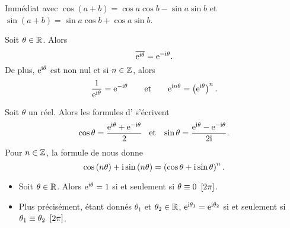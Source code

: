 \documentclass{magnolia}
\begin{document}
\begin{preuve}
Immédiat avec $\cos(a+b)=\cos a\cos b-\sin a\sin b$ et $\sin(a+b)=\sin a\cos b+\cos a\sin b$.
\end{preuve}

\begin{proposition}[utile=-3]
Soit $\theta\in\mathbb{R}$. Alors
\[\overline{{\rm e}^{{\rm i}\theta}}={\rm e}^{-{\rm i}\theta}.\]
De plus, ${\rm e}^{{\rm i}\theta}$ est non nul et si $n\in\mathbb{Z}$, alors
\[\frac{1}{{\rm e}^{{\rm i}\theta}}={\rm e}^{-{\rm i}\theta} \qquad\text{et}\qquad {\rm e}^{{\rm i} n\theta}=
  \left({\rm e}^{{\rm i} \theta}\right)^n.\]  
\end{proposition}


\begin{proposition}[utile=-3, nom={Formules d'\nom{Euler} et \nom{Moivre}}]
Soit $\theta$ un réel. Alors les formules d' s'écrivent
\[\cos\theta=\frac{{\rm e}^{{\rm i} \theta}+{\rm e}^{-{\rm i}\theta}}{2} \quad\!\text{et}\quad\!
  \sin\theta=\frac{{\rm e}^{{\rm i} \theta}-{\rm e}^{-{\rm i}\theta}}{2{\rm i}}.\]
Pour $n\in\mathbb{Z}$, la formule de  nous donne
\[\cos \left(n\theta\right)+{\rm i}\sin\left(n\theta\right)=\left(\cos \theta+{\rm i}\sin \theta\right)^n.\]
\end{proposition}


\begin{proposition}[utile=-3]
\begin{itemize}
\item Soit $\theta\in\mathbb{R}$. Alors ${\rm e}^{{\rm i}\theta}=1$ si et seulement si
  $\theta\equiv 0\ \left[2\pi\right]$.
\item Plus précisément, étant donnés $\theta_1$ et $\theta_2\in\mathbb{R}$,
  ${\rm e}^{{\rm i}\theta_1}={\rm e}^{{\rm i}\theta_2}$ si et seulement si
  $\theta_1\equiv\theta_2\ \cro{2\pi}$.
\end{itemize}
\end{proposition}
\end{document}
